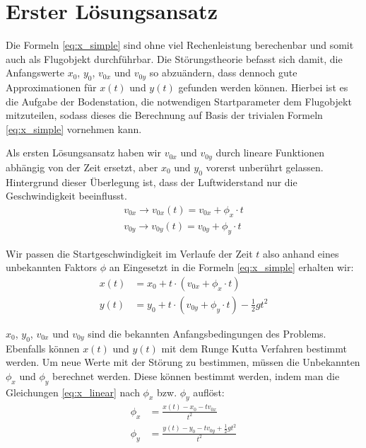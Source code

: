 \section{Erster Lösungsansatz
\label{perturbation:section:ersterloesungsansatz}}

Die Formeln \eqref{eq:x_simple} sind ohne viel Rechenleistung berechenbar und somit auch als Flugobjekt durchführbar.
Die Störungstheorie befasst sich damit, die Anfangswerte $x_0$, $y_0$, $v_{0x}$ und $v_{0y}$ so abzuändern,
dass dennoch gute Approximationen für $x(t)$ und $y(t)$ gefunden werden können.
Hierbei ist es die Aufgabe der Bodenstation, die notwendigen Startparameter dem Flugobjekt mitzuteilen,
sodass dieses die Berechnung auf Basis der trivialen Formeln \ref{eq:x_simple}  vornehmen kann.

Als ersten Lösungsansatz haben wir $v_{0x}$ und $v_{0y}$ durch lineare Funktionen abhängig von der Zeit ersetzt, aber $x_0$ und $y_0$ vorerst unberührt gelassen.
Hintergrund dieser Überlegung ist, dass der Luftwiderstand nur die Geschwindigkeit beeinflusst.
\begin{equation*}
	\begin{aligned}
		v_{0x} \rightarrow v_{0x}(t) = v_{0x} + \phi_x \cdot t\\
		v_{0y} \rightarrow v_{0y}(t) = v_{0y} + \phi_y \cdot t
	\end{aligned}
\end{equation*}



Wir passen die Startgeschwindigkeit im Verlaufe der Zeit $t$ also anhand eines unbekannten Faktors $\phi$ an
 Eingesetzt in die Formeln \eqref{eq:x_simple} erhalten wir:
\begin{equation}\label{eq:x_linear}
\begin{aligned}
    x(t) &= x_0 + t \cdot (v_{0x} + \phi_x \cdot t) \\
    y(t) &= y_0 + t \cdot (v_{0y} + \phi_y \cdot t) - \frac{1}{2}gt^2
\end{aligned}
\end{equation}

$x_0$, $y_0$, $v_{0x}$ und $v_{0y}$ sind die bekannten Anfangsbedingungen des Problems.
Ebenfalls können $x(t)$ und $y(t)$ mit dem Runge Kutta Verfahren bestimmt werden.
Um neue Werte mit der Störung zu bestimmen, müssen die Unbekannten $\phi_x$ und $\phi_y$ berechnet werden.
Diese können bestimmt werden, indem man die Gleichungen \eqref{eq:x_linear} nach $\phi_x$ bzw. $\phi_y$ auflöst:
\begin{equation}
	\begin{aligned}
	\phi_x &= \frac{x(t) - x_0 - tv_{0x}}{t^2}\\
	\phi_y &= \frac{y(t) - y_0 - tv_{0y} + \frac{1}{2}gt^2}{t^2}
	\end{aligned}
\end{equation}

